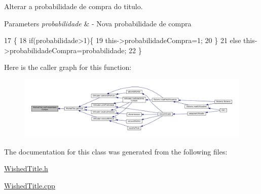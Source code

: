 Alterar a probabilidade de compra do titulo. 


\begin{DoxyParams}{Parameters}
{\em probabilidade} & -\/ Nova probabilidade de compra \\
\hline
\end{DoxyParams}

\begin{DoxyCode}
17                                                            \{
18     \textcolor{keywordflow}{if}(probabilidade>1)\{
19         this->probabilidadeCompra=1;
20     \}
21     \textcolor{keywordflow}{else} this->probabilidadeCompra=probabilidade;
22 \}
\end{DoxyCode}
Here is the caller graph for this function\+:
\nopagebreak
\begin{figure}[H]
\begin{center}
\leavevmode
\includegraphics[width=350pt]{classWishedTitle_aacaf6dfce83390dcc78f0ecd679e1de1_icgraph}
\end{center}
\end{figure}


The documentation for this class was generated from the following files\+:\begin{DoxyCompactItemize}
\item 
\hyperlink{WishedTitle_8h}{Wished\+Title.\+h}\item 
\hyperlink{WishedTitle_8cpp}{Wished\+Title.\+cpp}\end{DoxyCompactItemize}
